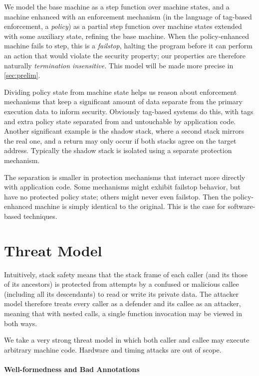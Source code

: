 \documentclass[acmsmall,review,anonymous]{acmart}\settopmatter{printfolios=true,printccs=false,printacmref=false}
\begin{document}
We model the base machine as a step function over machine states, and a machine
enhanced with an enforcement mechanism (in the language of tag-based enforcement,
a {\em policy}) as a partial step function over machine states extended with some
auxiliary state, refining the base machine. When the policy-enhanced machine fails
to step, this is a {\em failstop}, halting the program before it can perform an
action that would violate the security property;
our properties are therefore naturally \emph{termination insensitive.}
This model will be made more precise in \cref{sec:prelim}.

Dividing policy state from machine state helps us reason about
enforcement mechanisms that keep a significant amount of data separate from the
primary execution data to inform security. Obviously tag-based systems do this,
with tags and extra policy state separated from and untouchable by application code.
Another significant example is the shadow stack, where a second stack
mirrors the real one, and a return may only occur if both stacks agree on the
target address. Typically the shadow stack is isolated using a separate protection
mechanism.

The separation is smaller in protection mechanisms that interact more directly
with application code. Some mechanisms might exhibit failstop behavior, but have
no protected policy state; others might never even failstop. Then the policy-enhanced
machine is simply identical to the original. This is the case for software-based
techniques.

\section{Threat Model}
\label{sec:threat}

Intuitively, stack safety means that the stack frame of each caller (and its
those of its ancestors) is protected
from attempts by a confused or malicious callee (including all its descendants)
to read or write its private data.
The attacker model therefore treats every caller as a defender and its callee as
an attacker, meaning that with nested calls, a single function invocation
may be viewed in both ways.

We take a very strong threat model in which both caller and callee may execute
arbitrary machine code. Hardware and timing attacks are out of scope.

\paragraph*{Well-formedness and Bad Annotations}
\end{document}
